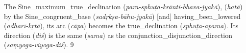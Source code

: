 \noindent\reversemarginpar{}%
The \gls{Sine_maximum_true_declination} (\textit{para-sphuṭa-krānti-bhava-jyakā}),  (\textit{hatā}) by the \gls{Sine_congruent_base} (\textit{sadṛkṣa-bāhu-jyakā}) [and] \gls{having_been_lowered} (\textit{adharī-kṛtā}), its \gls{arc} (\textit{cāpa}) becomes the \gls{true_declination} (\textit{sphuṭa-apama}). Its \gls{direction} (\textit{diś}) is the \gls{same} (\textit{sama}) as the \gls{conjunction_disjunction_direction} (\textit{saṃyoga-viyoga-diś}). 9

